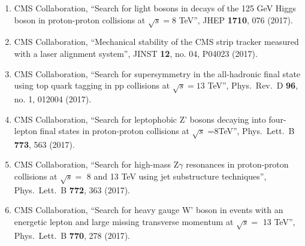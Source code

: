 \begin{itemize}
\begin{enumerate}
\item CMS Collaboration, ``Search for light bosons in decays of the 125 GeV Higgs boson in proton-proton collisions at $ \sqrt{s}=8 $ TeV'', JHEP {\bf 1710}, 076 (2017).

\item CMS Collaboration, ``Mechanical stability of the CMS strip tracker measured with a laser alignment system'', JINST {\bf 12}, no. 04, P04023 (2017).

\item CMS Collaboration, ``Search for supersymmetry in the all-hadronic final state using top quark tagging in pp collisions at $\sqrt s = 13$ TeV'', Phys.\ Rev.\ D {\bf 96}, no. 1, 012004 (2017).

\item CMS Collaboration, ``Search for leptophobic Z' bosons decaying into four-lepton final states in proton-proton collisions at $\sqrt s$ =8TeV'', Phys.\ Lett.\ B {\bf 773}, 563 (2017).

\item CMS Collaboration, ``Search for high-mass $\mathrm{ Z }\gamma$ resonances in proton-proton collisions at $\sqrt{s}=$ 8 and 13 TeV using jet substructure techniques'', Phys.\ Lett.\ B {\bf 772}, 363 (2017).

\item CMS Collaboration, ``Search for heavy gauge W' boson in events with an energetic lepton and large missing transverse momentum at $ \sqrt{s} = $ 13 TeV'', Phys.\ Lett.\ B {\bf 770}, 278 (2017).


\end{enumerate}
\end{itemize}
